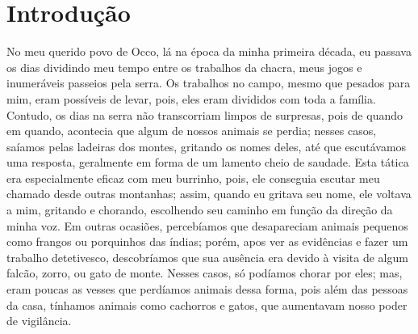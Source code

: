 \cleardoublepage
\newpage
{}
\chapter*{Introdução} %

No meu querido povo de Occo, lá na época da minha primeira década, eu passava os dias dividindo meu tempo entre os trabalhos da chacra, meus jogos e inumeráveis passeios pela serra.
Os trabalhos no campo, mesmo que pesados para mim, eram possíveis de levar, pois, eles eram divididos com toda a família.
Contudo, os dias na serra não transcorriam limpos de surpresas, pois de quando em quando, acontecia que algum de nossos animais se perdia; nesses casos, saíamos pelas ladeiras dos montes, gritando os nomes deles, até que escutávamos uma resposta, geralmente em forma de um lamento cheio de saudade.
Esta tática era especialmente eficaz com meu burrinho, pois, ele conseguia escutar meu chamado desde outras montanhas; assim, quando eu gritava seu nome, ele voltava a mim, gritando e chorando, escolhendo seu caminho em função da direção da minha voz.
Em outras ocasiões, percebíamos que desapareciam animais pequenos como frangos ou porquinhos das índias; porém, apos ver as evidências e fazer um trabalho detetivesco, descobríamos que sua ausência era devido à visita de algum falcão, zorro, ou gato de monte.
Nesses casos, só podíamos chorar por eles; mas,  eram poucas as vesses que perdíamos animais dessa forma, pois além das pessoas da casa, tínhamos animais como cachorros e gatos, que aumentavam nosso poder de vigilância.

